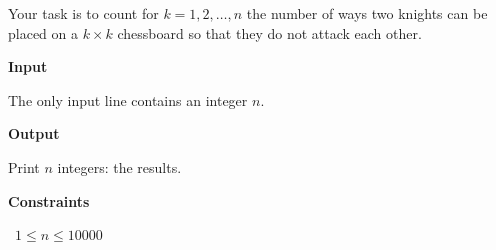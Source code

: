 Your task is to count for $k=1,2,\ldots,n$ the number of ways two knights can be placed on a $k \times k$ chessboard so that they do not attack each other.

\vspace{0.3cm}\noindent\textbf{Input}

The only input line contains an integer $n$.

\vspace{0.3cm}\noindent\textbf{Output}

Print $n$ integers: the results.

\vspace{0.3cm}\noindent\textbf{Constraints}

\textbullet\ $1 \le n \le 10000$